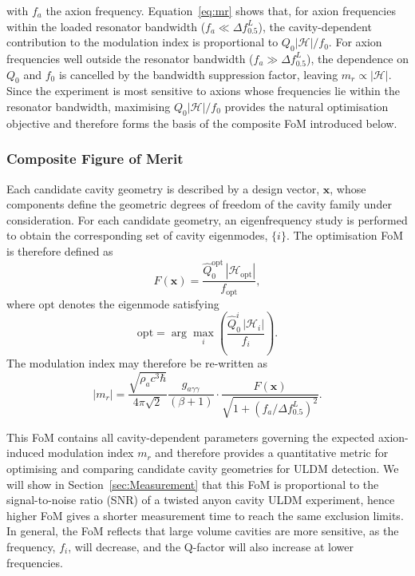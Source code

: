 \documentclass[
  aps,
  physrev,
  reprint,
  superscriptaddress,
  nofootinbib,
  amsmath,
  amssymb
]{revtex4-2}
\begin{document}
with $f_a$ the axion frequency. Equation~\eqref{eq:mr} shows that, for axion frequencies within the loaded resonator bandwidth ($f_a\ll\Delta f_{0.5}^L$), the cavity-dependent contribution to the modulation index is proportional to $Q_0|\mathscr H|/f_0$. For axion frequencies well outside the resonator bandwidth ($f_a\gg\Delta f_{0.5}^L$), the dependence on $Q_0$ and $f_0$ is cancelled by the bandwidth suppression factor, leaving $m_r\propto|\mathscr H|$. Since the experiment is most sensitive to axions whose frequencies lie within the resonator bandwidth, maximising $Q_0|\mathscr H|/f_0$ provides the natural optimisation objective and therefore forms the basis of the composite FoM introduced below.

\subsubsection{Composite Figure of Merit}
\label{sec:FoM}


Each candidate cavity geometry is described by a design vector, $\mathbf{x}$, whose components define the geometric degrees of freedom of the cavity family under consideration. For each candidate geometry, an eigenfrequency study is performed to obtain the corresponding set of cavity eigenmodes, $\{i\}$. The optimisation FoM is therefore defined as
\begin{equation}
    F(\mathbf{x})=
    \frac{\hat{Q}_0^{\mathrm{opt}}\,|\mathscr{H}_{\mathrm{opt}}|}{f_{\mathrm{opt}}},
    \label{eq:FoM}
\end{equation}
where ${\mathrm{opt}}$ denotes the eigenmode satisfying
\begin{equation}
    \mathrm{opt}=
    \arg\max_i
    \left(
        \frac{\hat{Q}_0^i\,|\mathscr{H}_i|}{f_i}
    \right).
\end{equation}
The modulation index may therefore be re-written as
\begin{equation} \label{eq:mamUnit}
    |m_r| = \frac{\sqrt{\rho_a c^3 \hbar}}{4\pi\sqrt{2}} \frac{g_{a\gamma\gamma}}{(\beta + 1)}\cdot\frac{F(\mathbf{x})}{\sqrt{1 + (f_a/\Delta f_{0.5}^L)^2}}.
\end{equation}

This FoM contains all cavity-dependent parameters governing the expected axion-induced modulation index $m_r$ and therefore provides a quantitative metric for optimising and comparing candidate cavity geometries for ULDM detection. We will show in Section~\ref{sec:Measurement} that this FoM is proportional to the signal-to-noise ratio (SNR) of a twisted anyon cavity ULDM experiment, hence higher FoM gives a shorter measurement time to reach the same exclusion limits. In general, the FoM reflects that large volume cavities are more sensitive, as the frequency, $f_i$, will decrease, and the Q-factor will also increase at lower frequencies.
\end{document}
